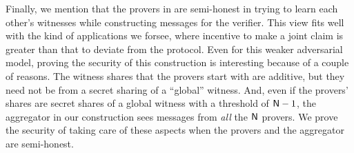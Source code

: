 Finally, we mention that the provers in \dpname{} are semi-honest in trying to learn 
each other's witnesses while constructing messages for the verifier. This view
fits well with the kind of applications we forsee, where incentive to make a
joint claim is greater than that to deviate from the protocol.
Even for this weaker adversarial model, proving the security of this
construction is interesting because of a couple of reasons. The witness shares
that the provers start with are additive, but they need not be from a secret
sharing of a ``global'' witness. And, even if the provers' shares are secret
shares of a global witness with a threshold of $\mathsf{N}-1$, the aggregator in our
construction sees messages from \textit{all} the $\mathsf{N}$ provers. We prove the
security of \dpname{} taking care of these aspects when the provers and the
aggregator are semi-honest.





